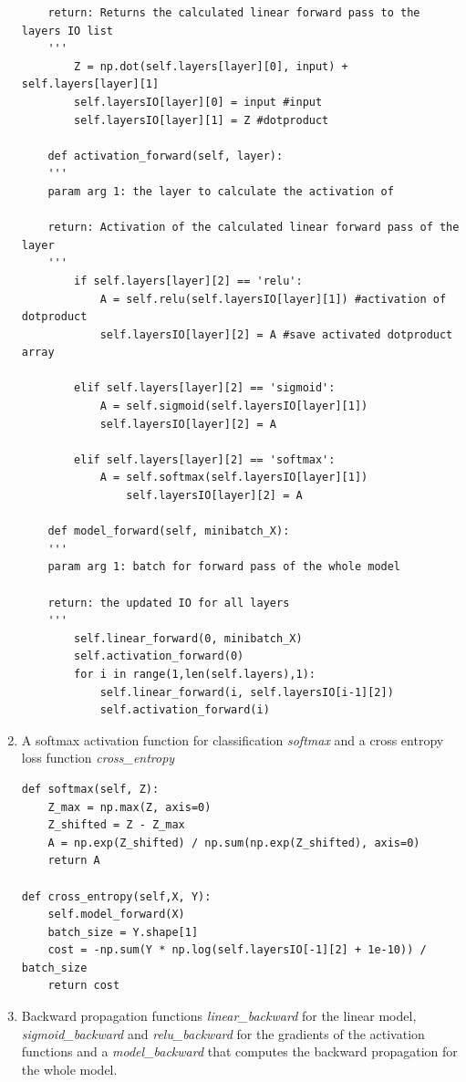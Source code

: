 \documentclass[a4paper,10pt]{article}
\begin{document}
\begin{enumerate}
\begin{lstlisting}
    return: Returns the calculated linear forward pass to the layers IO list 
    '''
        Z = np.dot(self.layers[layer][0], input) + self.layers[layer][1]   
        self.layersIO[layer][0] = input #input
        self.layersIO[layer][1] = Z #dotproduct

    def activation_forward(self, layer):
    '''
    param arg 1: the layer to calculate the activation of 

    return: Activation of the calculated linear forward pass of the layer
    '''
        if self.layers[layer][2] == 'relu':
            A = self.relu(self.layersIO[layer][1]) #activation of dotproduct
            self.layersIO[layer][2] = A #save activated dotproduct array

        elif self.layers[layer][2] == 'sigmoid':
            A = self.sigmoid(self.layersIO[layer][1])
            self.layersIO[layer][2] = A
                    
        elif self.layers[layer][2] == 'softmax':
            A = self.softmax(self.layersIO[layer][1])
                self.layersIO[layer][2] = A
      
    def model_forward(self, minibatch_X): 
    '''
    param arg 1: batch for forward pass of the whole model

    return: the updated IO for all layers 
    '''
        self.linear_forward(0, minibatch_X)
        self.activation_forward(0)
        for i in range(1,len(self.layers),1):
            self.linear_forward(i, self.layersIO[i-1][2])
            self.activation_forward(i)

        \end{lstlisting}

    \item A softmax activation function for classification \emph{softmax} and a cross entropy loss function \emph{cross\_entropy}

\begin{lstlisting}
def softmax(self, Z):
    Z_max = np.max(Z, axis=0)
    Z_shifted = Z - Z_max
    A = np.exp(Z_shifted) / np.sum(np.exp(Z_shifted), axis=0)
    return A

def cross_entropy(self,X, Y):
    self.model_forward(X)
    batch_size = Y.shape[1]
    cost = -np.sum(Y * np.log(self.layersIO[-1][2] + 1e-10)) / batch_size
    return cost
\end{lstlisting}

    \item Backward propagation functions \emph{linear\_backward} for the linear model, \emph{sigmoid\_backward} and \emph{relu\_backward} for the gradients of the activation functions and a \emph{model\_backward} that computes the backward propagation for the whole model. 


\end{enumerate}
\end{document}
